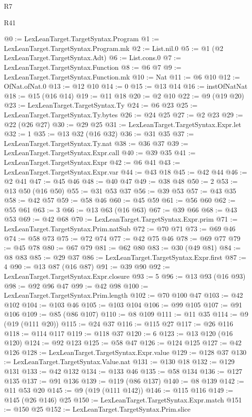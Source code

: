 \begin{lexlean}{R7}
\begin{lexlean}{R41}
\begin{coremodule}
{{{{{{{{{{{{{{{{{{{{{@0 := LexLeanTarget.TargetSyntax.Program
@1 := LexLeanTarget.TargetSyntax.Program.mk
@2 := List.nil.{0}
@5 := @1 (@2 LexLeanTarget.TargetSyntax.Adt)
@6 := List.cons.{0}
@7 := LexLeanTarget.TargetSyntax.Function
@8 := @6 @7
@9 := LexLeanTarget.TargetSyntax.Function.mk
@10 := Nat
@11 := @6 @10
@12 := OfNat.ofNat.{0}
@13 := @12 @10
@14 := 0
@15 := @13 @14
@16 := instOfNatNat
@18 := @15 (@16 @14)
@19 := @11 @18
@20 := @2 @10
@22 := @9 (@19 @20)
@23 := LexLeanTarget.TargetSyntax.Ty
@24 := @6 @23
@25 := LexLeanTarget.TargetSyntax.Ty.bytes
@26 := @24 @25
@27 := @2 @23
@29 := @22 (@26 @27)
@30 := @29 @25
@31 := LexLeanTarget.TargetSyntax.Expr.let
@32 := 1
@35 := @13 @32 (@16 @32)
@36 := @31 @35
@37 := LexLeanTarget.TargetSyntax.Ty.nat
@38 := @36 @37
@39 := LexLeanTarget.TargetSyntax.Expr.call
@40 := @39 @35
@41 := LexLeanTarget.TargetSyntax.Expr
@42 := @6 @41
@43 := LexLeanTarget.TargetSyntax.Expr.var
@44 := @43 @18
@45 := @42 @44
@46 := @2 @41
@47 := @45 @46
@48 := @40 @47
@49 := @38 @48
@50 := 2
@53 := @13 @50 (@16 @50)
@55 := @31 @53 @37
@56 := @39 @53
@57 := @43 @35
@58 := @42 @57
@59 := @58 @46
@60 := @45 @59
@61 := @56 @60
@62 := @55 @61
@63 := 3
@66 := @13 @63 (@16 @63)
@67 := @39 @66
@68 := @43 @53
@69 := @42 @68
@70 := LexLeanTarget.TargetSyntax.Expr.prim
@71 := LexLeanTarget.TargetSyntax.Prim.natSub
@72 := @70 @71
@73 := @69 @46
@74 := @58 @73
@75 := @72 @74
@77 := @42 @75 @46
@78 := @69 @77
@79 := @45 @78
@80 := @67 @79
@81 := @62 @80
@83 := @30 (@49 @81)
@84 := @8 @83
@85 := @29 @37
@86 := LexLeanTarget.TargetSyntax.Expr.first
@87 := 4
@90 := @13 @87 (@16 @87)
@91 := @39 @90
@92 := LexLeanTarget.TargetSyntax.Expr.closure
@93 := 5
@96 := @13 @93 (@16 @93)
@98 := @92 @96 @47
@99 := @42 @98
@100 := LexLeanTarget.TargetSyntax.Prim.length
@102 := @70 @100 @47
@103 := @42 @102
@104 := @103 @46
@105 := @103 @104
@106 := @99 @105
@107 := @91 @106
@109 := @85 (@86 @107)
@110 := @8 @109
@111 := @11 @35
@114 := @9 (@19 (@111 @20))
@115 := @24 @37
@116 := @115 @27
@117 := @26 @116
@118 := @114 @117
@119 := @118 @37
@120 := 6
@123 := @13 @120 (@16 @120)
@124 := @92 @123
@125 := @58 @47
@126 := @124 @125
@127 := @42 @126
@128 := LexLeanTarget.TargetSyntax.Expr.value
@129 := @128 @37
@130 := LexLeanTarget.TargetSyntax.Value.nat
@131 := @130 @18
@132 := @129 @131
@133 := @42 @132
@134 := @133 @46
@135 := @58 @134
@136 := @127 @135
@137 := @91 @136
@139 := @119 (@86 @137)
@140 := @8 @139
@142 := @11 @53 @20
@145 := @9 (@19 (@111 @142))
@146 := @115 @116
@149 := @145 (@26 @146) @25
@150 := LexLeanTarget.TargetSyntax.Expr.match
@151 := @150 @25
@152 := LexLeanTarget.TargetSyntax.Prim.slice
}}}}}}}}}}}}}}}}}}}}}
\end{coremodule}
\end{lexlean}
\end{lexlean}
